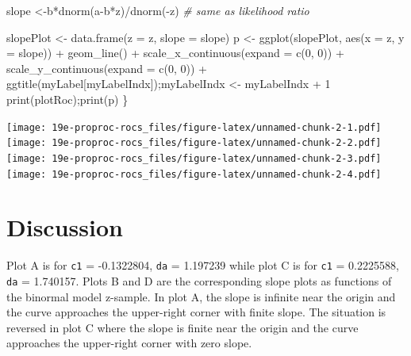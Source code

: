 \documentclass[
]{book}
\newenvironment{Shaded}{\begin{snugshade}}{\end{snugshade}}
\newcommand{\AttributeTok}[1]{\textcolor[rgb]{0.77,0.63,0.00}{#1}}
\newcommand{\CommentTok}[1]{\textcolor[rgb]{0.56,0.35,0.01}{\textit{#1}}}
\newcommand{\DecValTok}[1]{\textcolor[rgb]{0.00,0.00,0.81}{#1}}
\newcommand{\FunctionTok}[1]{\textcolor[rgb]{0.00,0.00,0.00}{#1}}
\newcommand{\NormalTok}[1]{#1}
\newcommand{\OtherTok}[1]{\textcolor[rgb]{0.56,0.35,0.01}{#1}}
\newcommand{\SpecialCharTok}[1]{\textcolor[rgb]{0.00,0.00,0.00}{#1}}
\begin{document}
\begin{Shaded}
\begin{Highlighting}[]
\NormalTok{  slope }\OtherTok{\textless{}{-}}\NormalTok{b}\SpecialCharTok{*}\FunctionTok{dnorm}\NormalTok{(a}\SpecialCharTok{{-}}\NormalTok{b}\SpecialCharTok{*}\NormalTok{z)}\SpecialCharTok{/}\FunctionTok{dnorm}\NormalTok{(}\SpecialCharTok{{-}}\NormalTok{z) }\CommentTok{\# same as likelihood ratio}
  
\NormalTok{  slopePlot }\OtherTok{\textless{}{-}} \FunctionTok{data.frame}\NormalTok{(}\AttributeTok{z =}\NormalTok{ z, }\AttributeTok{slope =}\NormalTok{ slope)}
\NormalTok{  p }\OtherTok{\textless{}{-}} \FunctionTok{ggplot}\NormalTok{(slopePlot, }\FunctionTok{aes}\NormalTok{(}\AttributeTok{x =}\NormalTok{ z, }\AttributeTok{y =}\NormalTok{ slope)) }\SpecialCharTok{+} 
    \FunctionTok{geom\_line}\NormalTok{()  }\SpecialCharTok{+} 
    \FunctionTok{scale\_x\_continuous}\NormalTok{(}\AttributeTok{expand =} \FunctionTok{c}\NormalTok{(}\DecValTok{0}\NormalTok{, }\DecValTok{0}\NormalTok{)) }\SpecialCharTok{+} 
    \FunctionTok{scale\_y\_continuous}\NormalTok{(}\AttributeTok{expand =} \FunctionTok{c}\NormalTok{(}\DecValTok{0}\NormalTok{, }\DecValTok{0}\NormalTok{))  }\SpecialCharTok{+}
    \FunctionTok{ggtitle}\NormalTok{(myLabel[myLabelIndx]);myLabelIndx }\OtherTok{\textless{}{-}}\NormalTok{ myLabelIndx }\SpecialCharTok{+} \DecValTok{1}
  \FunctionTok{print}\NormalTok{(plotRoc);}\FunctionTok{print}\NormalTok{(p)}
\NormalTok{\}}
\end{Highlighting}
\end{Shaded}

\texttt{[image: 19e-proproc-rocs\_files/figure-latex/unnamed-chunk-2-1.pdf]} \texttt{[image: 19e-proproc-rocs\_files/figure-latex/unnamed-chunk-2-2.pdf]} \texttt{[image: 19e-proproc-rocs\_files/figure-latex/unnamed-chunk-2-3.pdf]} \texttt{[image: 19e-proproc-rocs\_files/figure-latex/unnamed-chunk-2-4.pdf]}

\hypertarget{discussion}{%
\section{Discussion}\label{discussion}}

Plot A is for \texttt{c1} = -0.1322804, \texttt{da} = 1.197239 while plot C is for \texttt{c1} = 0.2225588, \texttt{da} = 1.740157. Plots B and D are the corresponding slope plots as functions of the binormal model z-sample. In plot A, the slope is infinite near the origin and the curve approaches the upper-right corner with finite slope. The situation is reversed in plot C where the slope is finite near the origin and the curve approaches the upper-right corner with zero slope.
\end{document}
